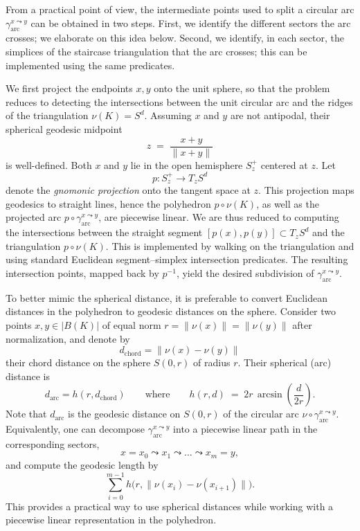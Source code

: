 \documentclass[a4paper,english,cleveref,autoref,thm-restate,nolineno]{socg-lipics-v2021}
\newcommand{\geomreal}[1] { |#1| } %
\begin{document}
\begin{note}
	\label{note:splitting_arc}
	From a practical point of view, the intermediate points used to split a circular arc $\gamma^{x\leadsto y}_\mathrm{arc}$ can be obtained in two steps.
	First, we identify the different sectors the arc crosses; we elaborate on this idea below.
	Second, we identify, in each sector, the simplices of the staircase triangulation that the arc crosses; this can be implemented using the same predicates.
	
	We first project the endpoints $x,y$ onto the unit sphere, so that the problem reduces to detecting the intersections between the unit circular arc and the ridges of the triangulation $\nu(K)=S^d$.
	Assuming $x$ and $y$ are not antipodal, their spherical geodesic midpoint
	\[
	z \;=\; \frac{x+y}{\|x+y\|}
	\]
	is well-defined.
	Both $x$ and $y$ lie in the open hemisphere $S^+_z$ centered at $z$.
	Let
	\[
	p\colon S^+_z \longrightarrow T_z S^d
	\]
	denote the \textit{gnomonic projection} onto the tangent space at $z$.
	This projection maps geodesics to straight lines, hence the polyhedron $p\circ \nu(K)$, as well as
	the projected arc $p\circ\gamma^{x\leadsto y}_\mathrm{arc}$, are piecewise linear.
	We are thus reduced to computing the intersections between the straight segment
	$[p(x),p(y)]\subset T_z S^d$ and the triangulation $p\circ\nu(K)$.
	This is implemented by walking on the triangulation and using standard Euclidean segment--simplex
	intersection predicates.
	The resulting intersection points, mapped back by $p^{-1}$, yield the desired subdivision of
	$\gamma^{x\leadsto y}_\mathrm{arc}$.
\end{note}

\begin{note}
	\label{note:arc_distance}
	To better mimic the spherical distance, it is preferable to convert Euclidean distances in the polyhedron to geodesic distances on the sphere.
	Consider two points $x,y\in\geomreal{B(K)}$ of equal norm $r=\|\nu(x)\|=\|\nu(y)\|$ after normalization, and denote by
	\[
	d_\mathrm{chord} = \|\nu(x)-\nu(y)\|
	\]
	their chord distance on the sphere $S(0,r)$ of radius $r$.
	Their spherical (arc) distance is
	\[
	d_\mathrm{arc} = h(r,d_\mathrm{chord})
	\qquad\text{where}\qquad
	h(r,d) \;=\; 2r\,\arcsin\!\left(\frac{d}{2r}\right).
	\]
	Note that $d_\mathrm{arc}$ is the geodesic distance on $S(0,r)$ of the circular arc
	$\nu\circ\gamma^{x\leadsto y}_\mathrm{arc}$.
	Equivalently, one can decompose $\gamma^{x\leadsto y}_\mathrm{arc}$ into a piecewise linear path in the corresponding sectors,
	\[
	x = x_0 \leadsto x_1 \leadsto \dots \leadsto x_m = y,
	\]
	and compute the geodesic length by
	\[
	\sum_{i=0}^{m-1} h\bigl(r, \|\nu(x_i)-\nu(x_{i+1})\|\bigr).
	\]
	This provides a practical way to use spherical distances while working with a piecewise linear representation in the polyhedron.
\end{note}
\end{document}
